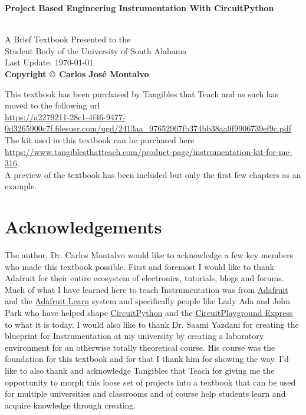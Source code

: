 \documentclass{article}
\begin{document}
\begin{center}
\begin{LARGE}{\bf Project Based Engineering Instrumentation With CircuitPython}\end{LARGE}\\
\large
\vspace{22 mm}
   A Brief Textbook Presented to the \\ 
   Student Body of the University of South Alabama \\
\vspace{22 mm}
\vspace{22 mm}
\vspace{22 mm}
       Last Update: \today\\
{\bf Copyright $\copyright$ Carlos Jos\'{e} Montalvo}
\end{center}

\linespread{1}

\newpage

\noindent This textbook has been purchased by Tangibles that Teach and as such
has moved to the following url\\
\url{https://a2279211-28c1-4f46-9477-0d3265900c7f.filesusr.com/ugd/2413aa_97652967fb374bb38aa9f9906739ef9c.pdf}
\ \\
The kit used in this textbook can be purchased here\\
\url{https://www.tangiblesthatteach.com/product-page/instrumentation-kit-for-me-316}.
\ \\
A preview of the textbook has been included but only the first few
chapters as an example.

\newpage

\section*{Acknowledgements}

The author, Dr. Carlos Montalvo would like to acknowledge a few key
members who made this textbook possible. First and foremost I would
like to thank Adafruit for their entire ecosystem of electronics,
tutorials, blogs and forums. Much of what I have learned here to teach
Instrumentation was from \href{https://www.adafruit.com/}{Adafruit}
and the \href{https://learn.adafruit.com/}{Adafruit Learn} system and 
specifically people like Lady Ada and John Park who have helped shape
\href{https://circuitpython.org/}{CircuitPython} and the
\href{https://www.adafruit.com/product/3333}{CircuitPlayground
  Express} to what it is today. I 
would also like to thank Dr. Saami Yazdani for creating the blueprint
for Instrumentation at my university by creating a laboratory
environment for an otherwise totally theoretical course. His course
was the foundation for this textbook and for that I thank him for
showing the way. I’d like to also thank and acknowledge Tangibles that
Teach for giving me the opportunity to morph this loose set of
projects into a textbook that can be used for multiple universities
and classrooms and of course help students learn and acquire knowledge
through creating.
\end{document}
